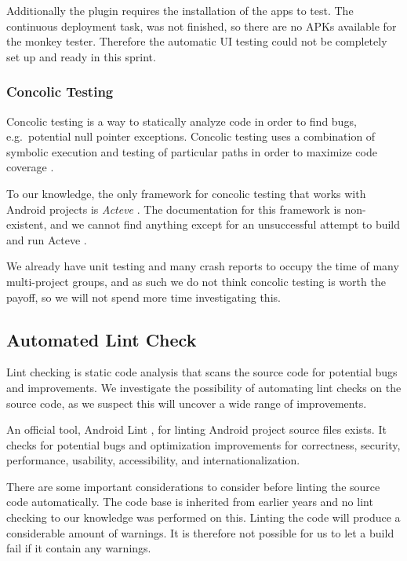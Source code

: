 Additionally the plugin requires the installation of the apps to test. The continuous deployment task, was not finished, so there are no APKs available for the monkey tester. Therefore the automatic UI testing could not be completely set up and ready in this sprint.

\subsubsection{Concolic Testing}
Concolic testing is a way to statically analyze code in order to find bugs, e.g.\ potential null pointer exceptions. Concolic testing uses a combination of symbolic execution and testing of particular paths in order to maximize code coverage \parencite{concolic_testing_2015}.

To our knowledge, the only framework for concolic testing that works with Android projects is \emph{Acteve} \parencite{AnandNHY12, AnandH11}. The documentation for this framework is non-existent, and we cannot find anything except for an unsuccessful attempt to build and run Acteve \parencite{chenxiong-acteve}.

We already have unit testing and many crash reports to occupy the time of many multi-project groups, and as such we do not think concolic testing is worth the payoff, so we will not spend more time investigating this.

\subsection{Automated Lint Check}\label{sec:automated_lint}
Lint checking is static code analysis that scans the source code for potential bugs and improvements. We investigate the possibility of automating lint checks on the source code, as we suspect this will uncover a wide range of improvements.

An official tool, Android Lint \parencite{AndroidLint}, for linting Android project source files exists. It checks for potential bugs and optimization improvements for correctness, security, performance, usability, accessibility, and internationalization.

There are some important considerations to consider before linting the source code automatically. The code base is inherited from earlier years and no lint checking to our knowledge was performed on this. Linting the code will produce a considerable amount of warnings. It is therefore not possible for us to let a build fail if it contain any warnings.

